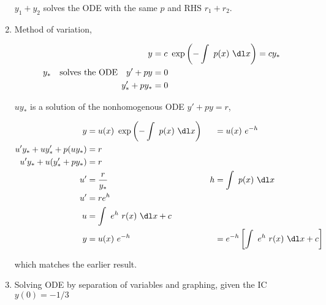 \begin{enumerate}
          $ y_{1} + y_{2} $ solves the ODE with the same $ p $ and RHS $ r_{1} + r_{2} $.

    \item Method of variation,

          \begin{align}
              y                                               & = c\ \exp\left( -\int\ p(x)\ \dl x \right)= cy_{*} \\
              y_{*} \quad \text{solves the ODE} \quad y' + py & = 0                                                \\
              y_{*}' + py_{*}                                 & = 0
          \end{align}

          $ uy_{*} $ is a solution of the nonhomogenous ODE $ y' +py = r $,

          \begin{align}
              y                             & = u(x)\ \exp\left( -\int\ p(x)\ \dl x \right) &   & = u(x)\ e^{-h}                                       \\
              u'y_{*} + uy_{*}' + p(uy_{*}) & = r                                                                                                      \\
              u'y_{*} + u (y_{*}' + py_{*}) & = r                                                                                                      \\
              u'                            & = \frac{r}{y_{*}}                             & h & = \int\ p(x)\ \dl x                                  \\
              u'                            & = re^{h}                                                                                                 \\
              u                             & = \int\ e^{h}\ r(x)\ \dl x + c                                                                           \\
              y                             & = u(x)\ e^{-h}                                &   & = e^{-h} \left[ \int\ e^{h}\ r(x)\ \dl x + c \right]
          \end{align}

          which matches the earlier result.

    \item Solving ODE by separation of variables and graphing, given the IC $ y(0) = -1/3 $


\end{enumerate}
